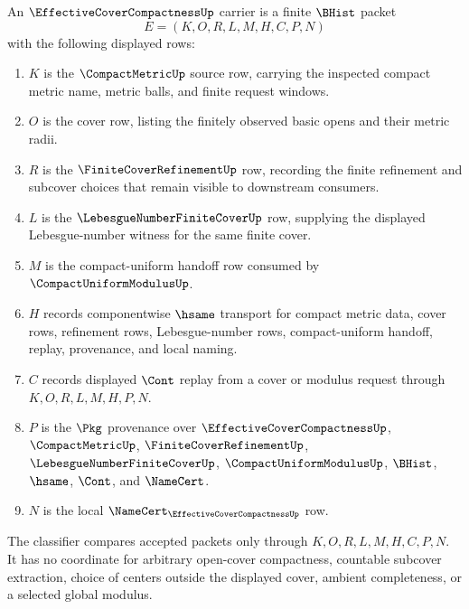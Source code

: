 \begin{definition}
\label{def:effective-cover-compactness-carrier}
An $\EffectiveCoverCompactnessUp$ carrier is a finite $\BHist$ packet
$$
E=(K,O,R,L,M,H,C,P,N)
$$
with the following displayed rows:
\begin{enumerate}
\item $K$ is the $\CompactMetricUp$ source row, carrying the inspected compact metric name, metric balls, and finite request windows.
\item $O$ is the cover row, listing the finitely observed basic opens and their metric radii.
\item $R$ is the $\FiniteCoverRefinementUp$ row, recording the finite refinement and subcover choices that remain visible to downstream consumers.
\item $L$ is the $\LebesgueNumberFiniteCoverUp$ row, supplying the displayed Lebesgue-number witness for the same finite cover.
\item $M$ is the compact-uniform handoff row consumed by $\CompactUniformModulusUp$.
\item $H$ records componentwise $\hsame$ transport for compact metric data, cover rows, refinement rows, Lebesgue-number rows, compact-uniform handoff, replay, provenance, and local naming.
\item $C$ records displayed $\Cont$ replay from a cover or modulus request through $K,O,R,L,M,H,P,N$.
\item $P$ is the $\Pkg$ provenance over $\EffectiveCoverCompactnessUp$, $\CompactMetricUp$, $\FiniteCoverRefinementUp$, $\LebesgueNumberFiniteCoverUp$, $\CompactUniformModulusUp$, $\BHist$, $\hsame$, $\Cont$, and $\NameCert$.
\item $N$ is the local $\NameCert_{\EffectiveCoverCompactnessUp}$ row.
\end{enumerate}
The classifier compares accepted packets only through $K,O,R,L,M,H,C,P,N$. It has no coordinate for arbitrary open-cover compactness, countable subcover extraction, choice of centers outside the displayed cover, ambient completeness, or a selected global modulus.
\end{definition}

